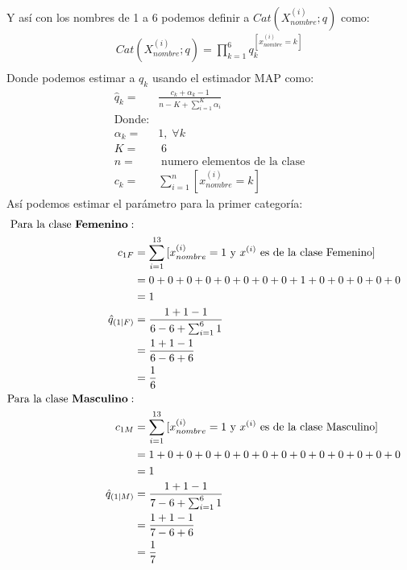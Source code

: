 \documentclass[12pt]{article}
\begin{document}
 \paragraph{}Y así con los nombres de 1 a 6 podemos definir a $Cat(X_{nombre}^{(i)};q)$ como:\\
 \begin{equation}
 \begin{split}
 Cat(X_{nombre}^{(i)};q) = \prod_{k=1}^{6}q_{k}^{[x_{nombre}^{(i)}=k ]}\\
 \end{split}
 \end{equation}
 Donde podemos estimar a $q_k$ usando el estimador MAP como:
 \begin{equation}
 \begin{split}
 \hat{q}_k =& \frac{c_k + \alpha_k - 1}{n - K + \sum_{i=1}^{K}{\alpha_i}} \\ 
 \text{Donde:}&\\
 \alpha_k =& 1,\; \forall k\\
 K =& \; 6\\
 n =& \; \text{numero elementos de la clase}\\
 c_k =& \sum_{i = 1}^{n}{[x^{(i)}_{nombre}=k]}
 \end{split}
 \end{equation}
 Así podemos estimar el parámetro para la primer categoría:\\
 \begin{equation}
 \begin{split}
 \text{Para la clase \textbf{Femenino}}:\\
 c_{1F} &= \sum_{i = 1}^{13}{[x^{(i)}_{nombre}=1 \text{ y $x^{(i)}$ es de la clase Femenino}]}\\
 &= 0 + 0 + 0 + 0 + 0 + 0 + 0 + 0 + 1 + 0 + 0 + 0 + 0 + 0\\
 &= 1\\
 \hat{q}_{(1|F)} &= \frac{1 + 1 - 1}{6 - 6 + \sum_{i=1}^{6}{1}} \\
 &= \frac{1 + 1 - 1}{6 - 6 + 6} \\  
 &= \frac{1}{6} \\
 \text{Para la clase \textbf{Masculino}}:\\
 c_{1M} &= \sum_{i = 1}^{13}{[x^{(i)}_{nombre}=1 \text{ y $x^{(i)}$ es de la clase Masculino}]}\\
 &= 1 + 0 + 0 + 0 + 0 + 0 + 0 + 0 + 0 + 0 + 0 + 0 + 0 + 0\\
 &= 1\\
 \hat{q}_{(1|M)} &= \frac{1 + 1 - 1}{7 - 6 + \sum_{i=1}^{6}{1}} \\
 &= \frac{1 + 1 - 1}{7 - 6 + 6} \\  
 &= \frac{1}{7} \\
 \end{split}
 \end{equation}
\end{document}
